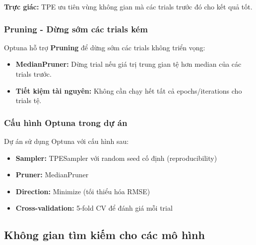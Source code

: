 \documentclass[12pt,a4paper]{article}
\begin{document}
\textbf{Trực giác:} TPE ưu tiên vùng không gian mà các trials trước đó cho kết quả tốt.

\subsubsection{Pruning - Dừng sớm các trials kém}

Optuna hỗ trợ \textbf{Pruning} để dừng sớm các trials không triển vọng:

\begin{itemize}
    \item \textbf{MedianPruner:} Dừng trial nếu giá trị trung gian tệ hơn median của các trials trước.
    \item \textbf{Tiết kiệm tài nguyên:} Không cần chạy hết tất cả epochs/iterations cho trials tệ.
\end{itemize}

\subsubsection{Cấu hình Optuna trong dự án}

Dự án sử dụng Optuna với cấu hình sau:
\begin{itemize}
    \item \textbf{Sampler:} TPESampler với random seed cố định (reproducibility)
    \item \textbf{Pruner:} MedianPruner
    \item \textbf{Direction:} Minimize (tối thiểu hóa RMSE)
    \item \textbf{Cross-validation:} 5-fold CV để đánh giá mỗi trial
\end{itemize}

\subsection{Không gian tìm kiếm cho các mô hình}
\end{document}
